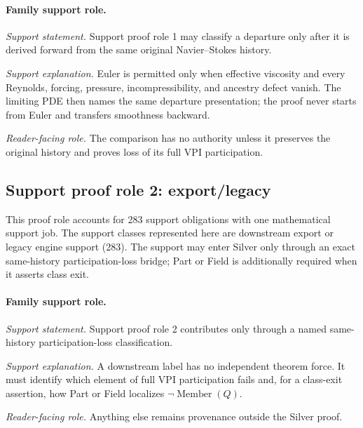 \paragraph{Family support role.}
\emph{Support statement.} Support proof role 1 may classify a departure only after it is derived forward from the same original Navier--Stokes history.

\emph{Support explanation.} Euler is permitted only when effective viscosity and every Reynolds, forcing, pressure, incompressibility, and ancestry defect vanish. The limiting PDE then names the same departure presentation; the proof never starts from Euler and transfers smoothness backward.

\emph{Reader-facing role.} The comparison has no authority unless it preserves the original history and proves loss of its full VPI participation.

\subsection{Support proof role 2: export/legacy}
This proof role accounts for 283 support obligations with one mathematical support job. The support classes represented here are downstream export or legacy engine support (283). The support may enter Silver only through an exact same-history participation-loss bridge; Part or Field is additionally required when it asserts class exit.

\paragraph{Family support role.}
\emph{Support statement.} Support proof role 2 contributes only through a named same-history participation-loss classification.

\emph{Support explanation.} A downstream label has no independent theorem force. It must identify which element of full VPI participation fails and, for a class-exit assertion, how Part or Field localizes \(\neg\operatorname{Member}(Q)\).

\emph{Reader-facing role.} Anything else remains provenance outside the Silver proof.

